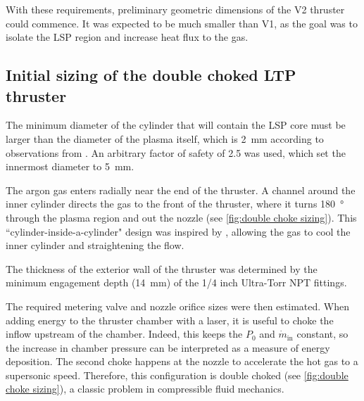             With these requirements, preliminary geometric dimensions of the V2 thruster could commence. It was expected to be much smaller than V1, as the goal was to isolate the LSP region and increase heat flux to the gas.

        \subsection{Initial sizing of the double choked LTP thruster}

            The minimum diameter of the cylinder that will contain the LSP core must be larger than the diameter of the plasma itself, which is \qty{2}{mm} according to observations from \textcite{duplayArgonLaserPlasmaThruster2024a}. An arbitrary factor of safety of 2.5 was used, which set the innermost diameter to \qty{5}{mm}.

            The argon gas enters radially near the end of the thruster. A channel around the inner cylinder directs the gas to the front of the thruster, where it turns \qty{180}{\degree} through the plasma region and out the nozzle (see \autoref{fig:double choke sizing}). This ``cylinder-inside-a-cylinder" design was inspired by \textcite{toyodaThrustPerformanceCW2002}, allowing the gas to cool the inner cylinder and straightening the flow.

            The thickness of the exterior wall of the thruster was determined by the minimum engagement depth (\qty{14}{mm}) of the 1/4 inch Ultra-Torr NPT fittings.

            The required metering valve and nozzle orifice sizes were then estimated. When adding energy to the thruster chamber with a laser, it is useful to choke the inflow upstream of the chamber. Indeed, this keeps the $P_0$ and $\dot{m}_\mathrm{in}$ constant, so the increase in chamber pressure can be interpreted as a measure of energy deposition. The second choke happens at the nozzle to accelerate the hot gas to a supersonic speed. Therefore, this configuration is double choked (see \autoref{fig:double choke sizing}), a classic problem in compressible fluid mechanics.

